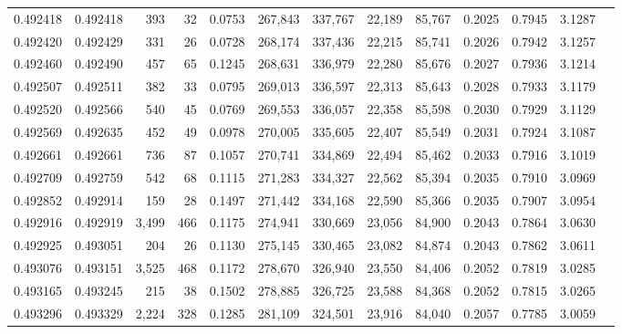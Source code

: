 \begin{tabular}{rrrrrrrrrrrrr}
0.492418 & 0.492418 &   393 &    32 &                                     0.0753 & 267,843 & 337,767 &  22,189 &  85,767 & 0.2025 & 0.7945 & 3.1287 \\
0.492420 & 0.492429 &   331 &    26 &                                     0.0728 & 268,174 & 337,436 &  22,215 &  85,741 & 0.2026 & 0.7942 & 3.1257 \\
0.492460 & 0.492490 &   457 &    65 &                                     0.1245 & 268,631 & 336,979 &  22,280 &  85,676 & 0.2027 & 0.7936 & 3.1214 \\
0.492507 & 0.492511 &   382 &    33 &                                     0.0795 & 269,013 & 336,597 &  22,313 &  85,643 & 0.2028 & 0.7933 & 3.1179 \\
0.492520 & 0.492566 &   540 &    45 &                                     0.0769 & 269,553 & 336,057 &  22,358 &  85,598 & 0.2030 & 0.7929 & 3.1129 \\
0.492569 & 0.492635 &   452 &    49 &                                     0.0978 & 270,005 & 335,605 &  22,407 &  85,549 & 0.2031 & 0.7924 & 3.1087 \\
0.492661 & 0.492661 &   736 &    87 &                                     0.1057 & 270,741 & 334,869 &  22,494 &  85,462 & 0.2033 & 0.7916 & 3.1019 \\
0.492709 & 0.492759 &   542 &    68 &                                     0.1115 & 271,283 & 334,327 &  22,562 &  85,394 & 0.2035 & 0.7910 & 3.0969 \\
0.492852 & 0.492914 &   159 &    28 &                                     0.1497 & 271,442 & 334,168 &  22,590 &  85,366 & 0.2035 & 0.7907 & 3.0954 \\
0.492916 & 0.492919 & 3,499 &   466 &                                     0.1175 & 274,941 & 330,669 &  23,056 &  84,900 & 0.2043 & 0.7864 & 3.0630 \\
0.492925 & 0.493051 &   204 &    26 &                                     0.1130 & 275,145 & 330,465 &  23,082 &  84,874 & 0.2043 & 0.7862 & 3.0611 \\
0.493076 & 0.493151 & 3,525 &   468 &                                     0.1172 & 278,670 & 326,940 &  23,550 &  84,406 & 0.2052 & 0.7819 & 3.0285 \\
0.493165 & 0.493245 &   215 &    38 &                                     0.1502 & 278,885 & 326,725 &  23,588 &  84,368 & 0.2052 & 0.7815 & 3.0265 \\
0.493296 & 0.493329 & 2,224 &   328 &                                     0.1285 & 281,109 & 324,501 &  23,916 &  84,040 & 0.2057 & 0.7785 & 3.0059 \\

\end{tabular}

